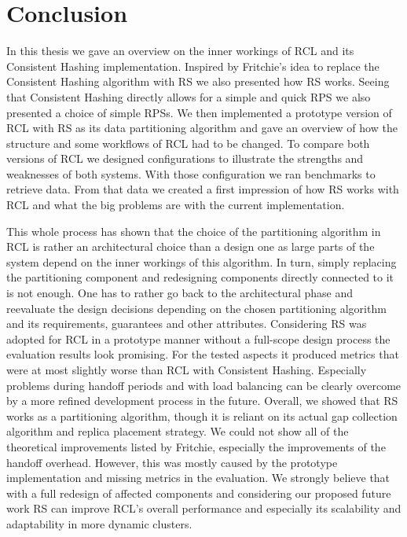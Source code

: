 \chapter{Conclusion}
In this thesis we gave an overview on the inner workings of \ac{RCL} and its Consistent Hashing implementation.
Inspired by Fritchie's idea to replace the Consistent Hashing algorithm with \ac{RS} we also presented how \ac{RS} works.
Seeing that Consistent Hashing directly allows for a simple and quick \ac{RPS} we also presented a choice of simple \acp{RPS}.
We then implemented a prototype version of \ac{RCL} with \ac{RS} as its data partitioning algorithm and gave an overview of how the structure and some workflows of \ac{RCL} had to be changed.
To compare both versions of \ac{RCL} we designed configurations to illustrate the strengths and weaknesses of both systems.
With those configuration we ran benchmarks to retrieve data.
From that data we created a first impression of how \ac{RS} works with \ac{RCL} and what the big problems are with the current implementation.

This whole process has shown that the choice of the partitioning algorithm in \ac{RCL} is rather an architectural choice than a design one as large parts of the system depend on the inner workings of this algorithm.
In turn, simply replacing the partitioning component and redesigning components directly connected to it is not enough.
One has to rather go back to the architectural phase and reevaluate the design decisions depending on the chosen partitioning algorithm and its requirements, guarantees and other attributes.
Considering \ac{RS} was adopted for \ac{RCL} in a prototype manner without a full-scope design process the evaluation results look promising.
For the tested aspects it produced metrics that were at most slightly worse than \ac{RCL} with Consistent Hashing.
Especially problems during handoff periods and with load balancing can be clearly overcome by a more refined development process in the future.
Overall, we showed that \ac{RS} works as a partitioning algorithm, though it is reliant on its actual gap collection algorithm and replica placement strategy.
We could not show all of the theoretical improvements listed by Fritchie, especially the improvements of the handoff overhead.
However, this was mostly caused by the prototype implementation and missing metrics in the evaluation.
We strongly believe that with a full redesign of affected components and considering our proposed future work \ac{RS} can improve \ac{RCL}'s overall performance and especially its scalability and adaptability in more dynamic clusters.